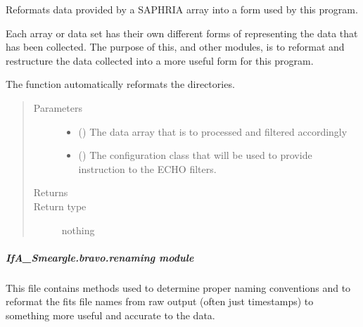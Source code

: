 \documentclass[letterpaper,10pt,english]{sphinxmanual}
\begin{document}
\begin{fulllineitems}
\label{\detokenize{python_docstrings/IfA_Smeargle.bravo.bravo_main:IfA_Smeargle.bravo.bravo_main.bravo_execution_saphria}}
Reformats data provided by a SAPHRIA array into a form used by this
program.

Each array or data set has their own different forms of representing the
data that has been collected. The purpose of this, and other modules, is
to reformat and restructure the data collected into a more useful form
for this program.

The function automatically reformats the directories.
\begin{quote}\begin{description}
\item[{Parameters}] \leavevmode\begin{itemize}
\item {} 
 () \textendash{} The data array that is to processed and filtered accordingly

\item {} 
 ({\hyperref[\detokenize{python_docstrings/IfA_Smeargle.yankee.yankee_main:IfA_Smeargle.yankee.yankee_main.SmeargleConfig}]{}}) \textendash{} The configuration class that will be used to provide instruction
to the ECHO filters.

\end{itemize}

\item[{Returns}] \leavevmode


\item[{Return type}] \leavevmode
nothing

\end{description}\end{quote}

\end{fulllineitems}



\subparagraph{IfA\_Smeargle.bravo.renaming module}
\label{\detokenize{python_docstrings/IfA_Smeargle.bravo.renaming:module-IfA_Smeargle.bravo.renaming}}\label{\detokenize{python_docstrings/IfA_Smeargle.bravo.renaming:ifa-smeargle-bravo-renaming-module}}\label{\detokenize{python_docstrings/IfA_Smeargle.bravo.renaming::doc}}
This file contains methods used to determine proper naming conventions and
to reformat the fits file names from raw output  (often just timestamps) to
something more useful and accurate to the data.
\end{document}
